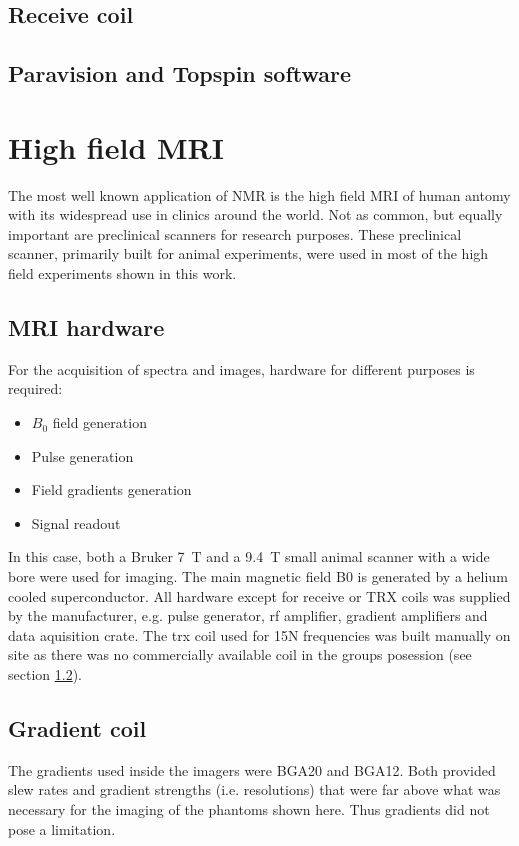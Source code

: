         \subsection{Receive coil}
        \subsection{Paravision and Topspin software}
    \section{High field MRI}
        The most well known application of NMR is the high field MRI of human antomy with its widespread use in clinics around the world. Not as common, but equally important are preclinical scanners for research purposes. These preclinical scanner, primarily built for animal experiments, were used in most of the high field experiments shown in this work.  \subsection{MRI hardware}
            For the acquisition of spectra and images, hardware for different purposes is required:
            \begin{itemize}
            \item $B_0$ field generation
            \item Pulse generation
            \item Field gradients generation
            \item Signal readout
            \end{itemize}
            In this case, both a Bruker \SI{7}{\tesla} and a \SI{9.4}{\tesla} small animal scanner with a wide bore were used for imaging. The main magnetic field B0 is generated by a helium cooled superconductor. All hardware except for receive or TRX coils was supplied by the manufacturer, e.g. pulse generator, rf amplifier, gradient amplifiers and data aquisition crate. The trx coil used for 15N frequencies was built manually on site as there was no commercially available coil in the groups posession (see section \ref{}).
        \subsection{Gradient coil}
            The gradients used inside the imagers were BGA20 and BGA12. Both provided slew rates and gradient strengths (i.e. resolutions) that were far above what was necessary for the imaging of the phantoms shown here. Thus gradients did not pose a limitation.
